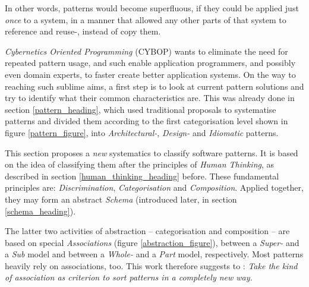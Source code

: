 In other words, patterns would become superfluous, if they could be applied
just \emph{once} to a system, in a manner that allowed any other parts of that
system to reference and reuse-, instead of copy them.

\emph{Cybernetics Oriented Programming} (CYBOP) wants to eliminate the need for
repeated pattern usage, and such enable application programmers, and possibly
even domain experts, to faster create better application systems. On the way to
reaching such sublime aims, a first step is to look at current pattern solutions
and try to identify what their common characteristics are. This was already
done in section \ref{pattern_heading}, which used traditional proposals
\cite{buschmann, gamma1995} to systematise patterns and divided them according
to the first categorisation level shown in figure \ref{pattern_figure}, into
\emph{Architectural-}, \emph{Design-} and \emph{Idiomatic} patterns.

This section proposes a \emph{new} systematics to classify software patterns.
It is based on the idea of classifying them after the principles of
\emph{Human Thinking}, as described in section \ref{human_thinking_heading}
before. These fundamental principles are: \emph{Discrimination},
\emph{Categorisation} and \emph{Composition}. Applied together, they may form
an abstract \emph{Schema} (introduced later, in section \ref{schema_heading}).

The latter two activities of abstraction -- categorisation and composition --
are based on special \emph{Associations} (figure \ref{abstraction_figure}),
between a \emph{Super-} and a \emph{Sub} model and between a \emph{Whole-} and
a \emph{Part} model, respectively. Most patterns heavily rely on associations,
too. This work therefore suggests to \cite{heller2005}: \textit{Take the kind
of association as criterion to sort patterns in a completely new way.}

